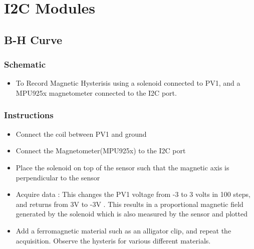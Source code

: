 \documentclass[a4paper,12pt,english]{sphinxmanual}
\begin{document}


\chapter{I2C Modules}
\label{\detokenize{index:i2c-modules}}

\section{B-H Curve}
\label{\detokenize{8.1:b-h-curve}}\label{\detokenize{8.1::doc}}

\subsection{Schematic}
\label{\detokenize{8.1:schematic}}\begin{itemize}
\item {} 
To Record Magnetic Hysterisis using a solenoid connected to PV1, and a MPU925x magnetometer connected to the I2C port.

\end{itemize}


\subsection{Instructions}
\label{\detokenize{8.1:instructions}}\begin{itemize}
\item {} 
Connect the coil between PV1 and ground

\item {} 
Connect the Magnetometer(MPU925x) to the I2C port

\item {} 
Place the solenoid on top of the sensor such that the magnetic axis is perpendicular to the sensor

\item {} 
Acquire data : This changes the PV1 voltage from -3 to 3 volts in 100 steps, and returns from 3V to -3V . This results in a proportional magnetic field generated by the solenoid which is also measured by the sensor and plotted

\item {} 
Add a ferromagnetic material such as an alligator clip, and repeat the acquisition. Observe the hysteris for various different materials.

\end{itemize}
\end{document}
